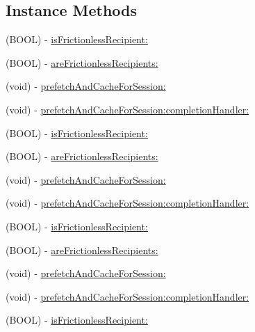 \subsection*{Instance Methods}
\begin{DoxyCompactItemize}
\item 
(B\+O\+OL) -\/ \hyperlink{interfaceFBFrictionlessRecipientCache_a9d03bd8dd9a235086cab18ab45b143cd}{is\+Frictionless\+Recipient\+:}
\item 
(B\+O\+OL) -\/ \hyperlink{interfaceFBFrictionlessRecipientCache_a8a6dcc263fb784a4a00fcd37a6a47ca6}{are\+Frictionless\+Recipients\+:}
\item 
(void) -\/ \hyperlink{interfaceFBFrictionlessRecipientCache_a4f218828f2b6a8bb5a8e0044e98689dc}{prefetch\+And\+Cache\+For\+Session\+:}
\item 
(void) -\/ \hyperlink{interfaceFBFrictionlessRecipientCache_a4c4c0f1fd519bfff5b39f3433fad29e3}{prefetch\+And\+Cache\+For\+Session\+:completion\+Handler\+:}
\item 
(B\+O\+OL) -\/ \hyperlink{interfaceFBFrictionlessRecipientCache_a9d03bd8dd9a235086cab18ab45b143cd}{is\+Frictionless\+Recipient\+:}
\item 
(B\+O\+OL) -\/ \hyperlink{interfaceFBFrictionlessRecipientCache_a8a6dcc263fb784a4a00fcd37a6a47ca6}{are\+Frictionless\+Recipients\+:}
\item 
(void) -\/ \hyperlink{interfaceFBFrictionlessRecipientCache_a4f218828f2b6a8bb5a8e0044e98689dc}{prefetch\+And\+Cache\+For\+Session\+:}
\item 
(void) -\/ \hyperlink{interfaceFBFrictionlessRecipientCache_a4c4c0f1fd519bfff5b39f3433fad29e3}{prefetch\+And\+Cache\+For\+Session\+:completion\+Handler\+:}
\item 
(B\+O\+OL) -\/ \hyperlink{interfaceFBFrictionlessRecipientCache_a9d03bd8dd9a235086cab18ab45b143cd}{is\+Frictionless\+Recipient\+:}
\item 
(B\+O\+OL) -\/ \hyperlink{interfaceFBFrictionlessRecipientCache_a8a6dcc263fb784a4a00fcd37a6a47ca6}{are\+Frictionless\+Recipients\+:}
\item 
(void) -\/ \hyperlink{interfaceFBFrictionlessRecipientCache_a4f218828f2b6a8bb5a8e0044e98689dc}{prefetch\+And\+Cache\+For\+Session\+:}
\item 
(void) -\/ \hyperlink{interfaceFBFrictionlessRecipientCache_a4c4c0f1fd519bfff5b39f3433fad29e3}{prefetch\+And\+Cache\+For\+Session\+:completion\+Handler\+:}
\item 
(B\+O\+OL) -\/ \hyperlink{interfaceFBFrictionlessRecipientCache_a9d03bd8dd9a235086cab18ab45b143cd}{is\+Frictionless\+Recipient\+:}

\end{DoxyCompactItemize}
